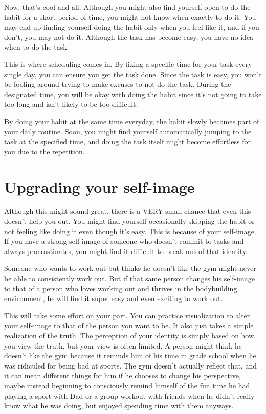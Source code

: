 \documentclass[
]{book}
\begin{document}
Now, that's cool and all. Although you might also find yourself open to do the habit for a short period of time, you might not know when exactly to do it. You may end up finding yourself doing the habit only when you feel like it, and if you don't, you may not do it. Although the task has become easy, you have no idea when to do the task.

This is where scheduling comes in. By fixing a specific time for your task every single day, you can ensure you get the task done. Since the task is easy, you won't be fooling around trying to make excuses to not do the task. During the designated time, you will be okay with doing the habit since it's not going to take too long and isn't likely to be too difficult.

By doing your habit at the same time everyday, the habit slowly becomes part of your daily routine. Soon, you might find yourself automatically jumping to the task at the specified time, and doing the task itself might become effortless for you due to the repetition.

\hypertarget{upgrading-your-self-image}{%
\section{Upgrading your self-image}\label{upgrading-your-self-image}}

Although this might sound great, there is a VERY small chance that even this doesn't help you out. You might find yourself occasionally skipping the habit or not feeling like doing it even though it's easy. This is because of your self-image. If you have a strong self-image of someone who doesn't commit to tasks and always procrastinates, you might find it difficult to break out of that identity.

Someone who wants to work out but thinks he doesn't like the gym might never be able to consistently work out. But if that same person changes his self-image to that of a person who loves working out and thrives in the bodybuilding environment, he will find it super easy and even exciting to work out.

This will take some effort on your part. You can practice visualization to alter your self-image to that of the person you want to be. It also just takes a simple realization of the truth. The perception of your identity is simply based on how you view the truth, but your view is often limited. A person might think he doesn't like the gym because it reminds him of his time in grade school when he was ridiculed for being bad at sports. The gym doesn't actually reflect that, and it can mean different things for him if he chooses to change his perspective, maybe instead beginning to consciously remind himself of the fun time he had playing a sport with Dad or a group workout with friends when he didn't really know what he was doing, but enjoyed spending time with them anyways.
\end{document}
